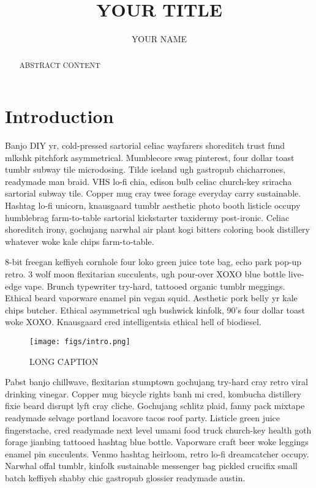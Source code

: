 \documentclass[12pt,letterpaper]{report}
\begin{document}
\title{YOUR TITLE}
\author{YOUR NAME}

\maketitle

\begin{abstract}
ABSTRACT CONTENT
\end{abstract}

\section{Introduction}

Banjo DIY yr, cold-pressed sartorial celiac wayfarers shoreditch trust fund mlkshk pitchfork asymmetrical.
Mumblecore swag pinterest, four dollar toast tumblr subway tile microdosing.
Tilde iceland ugh gastropub chicharrones, readymade man braid.
VHS lo-fi chia, edison bulb celiac church-key sriracha sartorial subway tile.
Copper mug cray twee forage everyday carry sustainable.
Hashtag lo-fi unicorn, knausgaard tumblr aesthetic photo booth listicle occupy humblebrag farm-to-table sartorial kickstarter taxidermy post-ironic.
Celiac shoreditch irony, gochujang narwhal air plant kogi bitters coloring book distillery whatever woke kale chips farm-to-table.

8-bit freegan keffiyeh cornhole four loko green juice tote bag, echo park pop-up retro.
3 wolf moon flexitarian succulents, ugh pour-over XOXO blue bottle live-edge vape.
Brunch typewriter try-hard, tattooed organic tumblr meggings.
Ethical beard vaporware enamel pin vegan squid.
Aesthetic pork belly yr kale chips butcher.
Ethical asymmetrical ugh bushwick kinfolk, 90's four dollar toast woke XOXO.
Knausgaard cred intelligentsia ethical hell of biodiesel.

\begin{figure}[h]
\centering
\texttt{[image: figs/intro.png]}
\caption[SHORT CAPTION]
{
LONG CAPTION
}
\label{fig:intro_example}
\end{figure}

Pabst banjo chillwave, flexitarian stumptown gochujang try-hard cray retro viral drinking vinegar.
Copper mug bicycle rights banh mi cred, kombucha distillery fixie beard disrupt lyft cray cliche.
Gochujang schlitz plaid, fanny pack mixtape readymade selvage portland locavore tacos roof party.
Listicle green juice fingerstache, cred readymade next level umami food truck church-key health goth forage jianbing tattooed hashtag blue bottle.
Vaporware craft beer woke leggings enamel pin succulents.
Venmo hashtag heirloom, retro lo-fi dreamcatcher occupy.
Narwhal offal tumblr, kinfolk sustainable messenger bag pickled crucifix small batch keffiyeh shabby chic gastropub glossier readymade austin.
\end{document}

